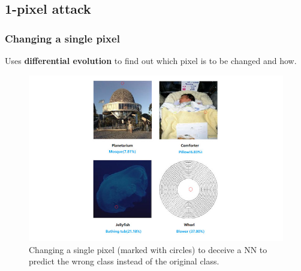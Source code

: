 \documentclass[14pt]{beamer}
\begin{document}
\subsection{1-pixel attack}
\begin{frame}
\frametitle{Changing a single pixel}
Uses \textbf{differential evolution} to find out which pixel is to be changed and how.
\begin{figure}
	\centering
	\includegraphics[width=0.8\linewidth]{img/adversarial-1pixel}
	\caption{Changing a single pixel (marked with circles) to deceive a NN to predict the wrong class instead of the original class.\protect\footnotemark}
	\label{fig:adversarial-1pixel}
\end{figure}


\end{frame}
\end{document}
